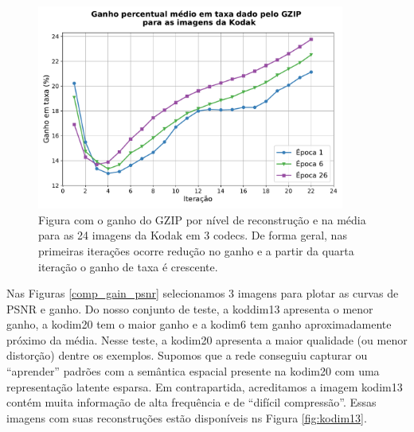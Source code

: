 \begin{figure}
	\centering
	\includegraphics[width=0.9\textwidth]{figuras/ganho_taxa_3epocas.pdf}
	\caption[Ganho do GZIP por nível de reconstrução]{Figura com o ganho do GZIP por nível de reconstrução e na média para as 24 imagens da Kodak em 3 codecs. De forma geral, nas primeiras iterações ocorre redução no ganho e a partir da quarta iteração o ganho de taxa é crescente.}  	
	\label{fig:gain_medio_bpp}
\end{figure}



Nas Figuras \ref{comp_gain_psnr} selecionamos 3 imagens para plotar as curvas de PSNR e ganho. Do nosso conjunto de teste, a koddim13  apresenta o menor ganho, a kodim20 tem o maior ganho e a kodim6 tem ganho aproximadamente próximo da média. 
Nesse teste, a kodim20 apresenta a maior qualidade (ou menor distorção) dentre os exemplos. Supomos que a rede conseguiu capturar ou ``aprender'' padrões com a semântica espacial presente na kodim20 com uma representação latente esparsa. 
Em contrapartida, acreditamos a imagem kodim13 contém muita informação de alta frequência e de ``difícil compressão''. Essas imagens com suas reconstruções estão disponíveis ns Figura \ref{fig:kodim13}.   



